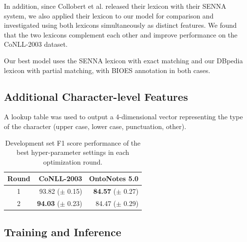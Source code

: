 \documentclass[11pt,letterpaper]{article}
\begin{document}
In addition, since Collobert et al.  released their lexicon with their SENNA system, we also applied their lexicon to our model for comparison and investigated using both lexicons simultaneously as distinct features. We found that the two lexicons complement each other and improve performance on the CoNLL-2003 dataset.

Our best model uses the SENNA lexicon with exact matching and our DBpedia lexicon with partial matching, with BIOES annotation in both cases. %

\subsection{Additional Character-level Features}

\label{sec:char-types}
A lookup table was used to output a 4-dimensional vector representing the type of the character (upper case, lower case, punctuation, other).%


\begin{table}[t]
\begin{center}
\small
\begin{tabular}{|c|r|r|}
\hline \bf Round & \bf CoNLL-2003 & \bf OntoNotes 5.0 \\ \hline
1 & 93.82 ($\pm$ 0.15) & {\bf 84.57} ($\pm$ 0.27) \\
2 & {\bf 94.03} ($\pm$ 0.23) & 84.47 ($\pm$ 0.29) \\
\hline
\end{tabular}
\end{center}
\caption{Development set F1 score performance of the best hyper-parameter settings in each optimization round.}
\label{tab:hyperopt-result}
\end{table}

\subsection{Training and Inference}
\end{document}
